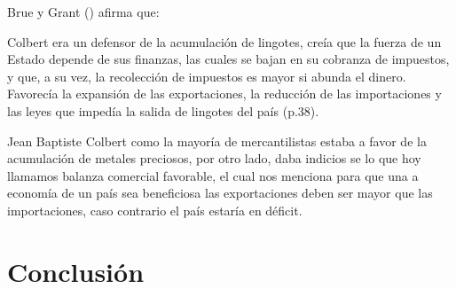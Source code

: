 \documentclass[
  jou,
  floatsintext,
  longtable,
  a4paper,
  nolmodern,
  notxfonts,
  notimes,
  colorlinks=true,linkcolor=blue,citecolor=blue,urlcolor=blue]{apa7}
\begin{document}
Brue y Grant ()
afirma que:

Colbert era un defensor de la acumulación de lingotes, creía que la
fuerza de un Estado depende de sus finanzas, las cuales se bajan en su
cobranza de impuestos, y que, a su vez, la recolección de impuestos es
mayor si abunda el dinero. Favorecía la expansión de las exportaciones,
la reducción de las importaciones y las leyes que impedía la salida de
lingotes del país (p.38).

Jean Baptiste Colbert como la mayoría de mercantilistas estaba a favor
de la acumulación de metales preciosos, por otro lado, daba indicios se
lo que hoy llamamos balanza comercial favorable, el cual nos menciona
para que una a economía de un país sea beneficiosa las exportaciones
deben ser mayor que las importaciones, caso contrario el país estaría en
déficit.

\section{Conclusión}\label{conclusiuxf3n}
\end{document}
